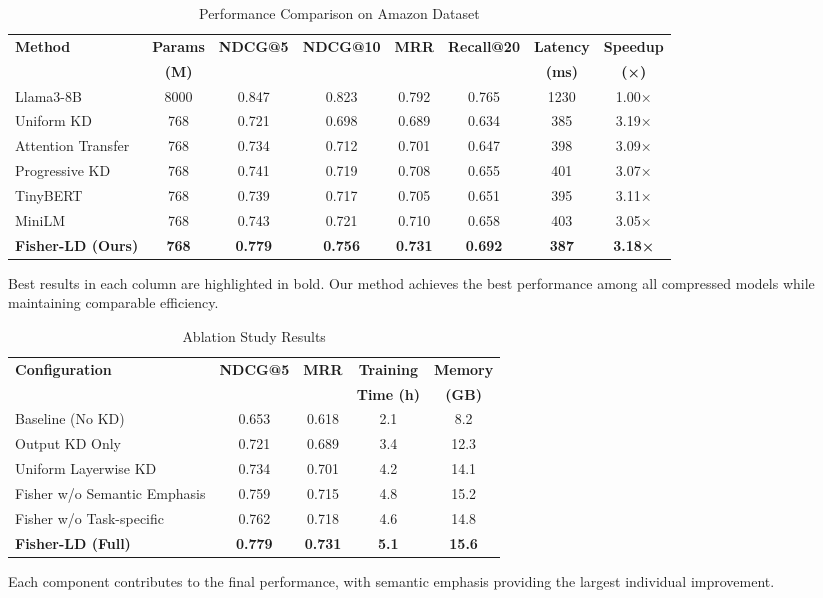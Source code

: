 
\begin{table}[!t]
\centering
\caption{Performance Comparison on Amazon Dataset}
\label{tab:main_results}
\begin{tabular}{l|c|c|c|c|c|c|c}
\hline
\textbf{Method} & \textbf{Params} & \textbf{NDCG@5} & \textbf{NDCG@10} & \textbf{MRR} & \textbf{Recall@20} & \textbf{Latency} & \textbf{Speedup} \\
& \textbf{(M)} & & & & & \textbf{(ms)} & \textbf{(×)} \\
\hline
Llama3-8B & 8000 & 0.847 & 0.823 & 0.792 & 0.765 & 1230 & 1.00× \\
\hline
Uniform KD & 768 & 0.721 & 0.698 & 0.689 & 0.634 & 385 & 3.19× \\
Attention Transfer & 768 & 0.734 & 0.712 & 0.701 & 0.647 & 398 & 3.09× \\
Progressive KD & 768 & 0.741 & 0.719 & 0.708 & 0.655 & 401 & 3.07× \\
TinyBERT & 768 & 0.739 & 0.717 & 0.705 & 0.651 & 395 & 3.11× \\
MiniLM & 768 & 0.743 & 0.721 & 0.710 & 0.658 & 403 & 3.05× \\
\hline
\textbf{Fisher-LD (Ours)} & \textbf{768} & \textbf{0.779} & \textbf{0.756} & \textbf{0.731} & \textbf{0.692} & \textbf{387} & \textbf{3.18×} \\
\hline
\end{tabular}
\vspace{-2mm}
\footnotesize{Best results in each column are highlighted in bold. Our method achieves the best performance among all compressed models while maintaining comparable efficiency.}
\end{table}


\begin{table}[!t]
\centering
\caption{Ablation Study Results}
\label{tab:ablation}
\begin{tabular}{l|c|c|c|c}
\hline
\textbf{Configuration} & \textbf{NDCG@5} & \textbf{MRR} & \textbf{Training} & \textbf{Memory} \\
& & & \textbf{Time (h)} & \textbf{(GB)} \\
\hline
Baseline (No KD) & 0.653 & 0.618 & 2.1 & 8.2 \\
Output KD Only & 0.721 & 0.689 & 3.4 & 12.3 \\
Uniform Layerwise KD & 0.734 & 0.701 & 4.2 & 14.1 \\
Fisher w/o Semantic Emphasis & 0.759 & 0.715 & 4.8 & 15.2 \\
Fisher w/o Task-specific & 0.762 & 0.718 & 4.6 & 14.8 \\
\hline
\textbf{Fisher-LD (Full)} & \textbf{0.779} & \textbf{0.731} & \textbf{5.1} & \textbf{15.6} \\
\hline
\end{tabular}
\vspace{-2mm}
\footnotesize{Each component contributes to the final performance, with semantic emphasis providing the largest individual improvement.}
\end{table}


